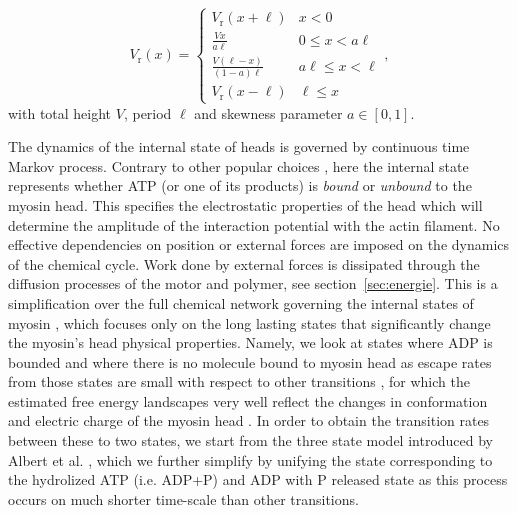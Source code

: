 \documentclass[aps,pre,twocolumn,showpacs,showkeys,superscriptaddress,floatfix]{revtex4-1}
\begin{document}
\begin{equation}
V_\text{r}(x) =  \begin{cases}
        V_\text{r}(x+\ell) & x < 0 \\[1ex] 
        \displaystyle \frac{ V x }{ a \ell } & 0 \leq x < a \ell \\[2ex]
        \displaystyle \frac{ V (\ell-x) }{ (1-a) \ell } & a \ell \leq x < \ell \\[2ex]
        V_\text{r}(x-\ell) & \ell \leq x  
   \end{cases} ,
   \label{eq:ratchet_potential}
\end{equation}
with total height $V$,
period $\ell$ 
and skewness parameter $a \in [0,1]$. 

The dynamics of the internal state of heads is governed by continuous time Markov process. 
Contrary to other popular choices \cite{}, here the internal state represents whether ATP (or one of its products) is \emph{bound} or \emph{unbound} to the myosin head. %
This specifies the electrostatic properties of the head which will determine the amplitude of the interaction potential with the actin filament.
No effective dependencies on position or external forces are imposed on the dynamics of the chemical cycle. 
Work done by external forces is dissipated through the diffusion processes of the motor and polymer, see section~\ref{sec:energie}.
This is a simplification over the full chemical network governing the internal states of myosin \cite{Bierbaum2011,Bierbaum2013},  
which focuses only on the long lasting states that significantly change the myosin's head physical properties.
Namely, we look at states where ADP is bounded and where there is no molecule bound to myosin head as escape rates from those states are small with respect to other transitions \cite{Bierbaum2011}, %
for which the estimated free energy landscapes \cite{Nie2014,nie2014conformational} very well reflect the changes in  conformation and electric charge of the myosin head \cite{barterls1993myosin}.
In order to obtain the transition rates between these to two states, we start from the three state model introduced by Albert et al. \cite{albert2014stochastic},
which we further simplify by unifying the state corresponding to the hydrolized ATP (i.e. ADP+P) and ADP with P released state as this process occurs on much shorter time-scale than other transitions.
\end{document}

